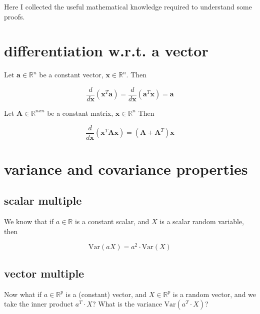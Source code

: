 \documentclass{article}
\begin{document}
\newpage
\begin{appendices}

Here I collected the useful mathematical knowledge required to understand some proofs.

\section{differentiation w.r.t. a vector}

Let $\mathbf{a} \in \mathbb{R}^n$ be a constant vector, $\mathbf{x} \in \mathbb{R}^n$. Then

\begin{equation} \label{eq:da_dx}
    \frac{d}{d\mathbf{x}} (\mathbf{x}^{T}\mathbf{a}) = \frac{d}{d\mathbf{x}} (\mathbf{a}^{T}\mathbf{x}) = \mathbf{a}
\end{equation}

Let $\mathbf{A} \in \mathbb{R}^{nxn}$ be a constant matrix, $\mathbf{x} \in \mathbb{R}^n$ Then

\begin{equation} \label{eq:dA_dx}
    \frac{d}{d\mathbf{x}} (\mathbf{x}^{T}\mathbf{A}\mathbf{x}) = (\mathbf{A} + \mathbf{A}^T) \mathbf{x}
\end{equation}

\section{variance and covariance properties}

\subsection{scalar multiple}

We know that if $a \in \mathbb{R}$ is a constant scalar, and $X$ is a scalar random variable, then

\begin{equation}
    \text{Var}(aX) = a^2 \cdot \text{Var}(X)
\end{equation}

\subsection{vector multiple}

Now what if $a \in \mathbb{R}^{p}$ is a (constant) vector, and $X \in \mathbb{R}^{p}$ is a random vector, and we take the inner product $a^T\cdot X$? What is the variance $\text{Var}(a^T\cdot X)$?


\end{appendices}
\end{document}

